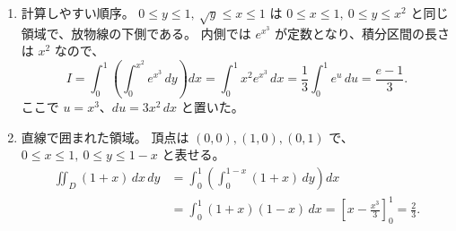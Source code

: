 \documentclass[a4paper,10pt,pdflatex,ja=standard,jafont=ipaex-type1,
  magstyle=real,scale=1]{bxjsarticle}
\newenvironment{problems}
  {\begin{enumerate}[leftmargin=2em,itemsep=3pt,topsep=3pt,parsep=0pt,
    font=\color{accent}]}
  {\end{enumerate}}
\newcommand{\examplelabel}[1]{{\sffamily\mdseries\color{ink}#1}}
\begin{document}
\begin{problems}
\item \examplelabel{計算しやすい順序。}
$0\le y\le1,\ \sqrt y\le x\le1$ は
$0\le x\le1,\ 0\le y\le x^2$ と同じ領域で、放物線の下側である。
内側では $e^{x^3}$ が定数となり、積分区間の長さは $x^2$ なので、
$$
 I=\int_0^1\left(\int_0^{x^2}e^{x^3}\,dy\right)dx
 =\int_0^1x^2e^{x^3}\,dx
 =\frac13\int_0^1e^u\,du=\frac{e-1}{3}.
$$
ここで $u=x^3$、$du=3x^2\,dx$ と置いた。

\item \examplelabel{直線で囲まれた領域。}
頂点は $(0,0),(1,0),(0,1)$ で、$0\le x\le1,\ 0\le y\le1-x$ と表せる。
$$
 \begin{aligned}
 \iint_D(1+x)\,dx\,dy
 &=\int_0^1\left(\int_0^{1-x}(1+x)\,dy\right)dx\\
 &=\int_0^1(1+x)(1-x)\,dx
 =\left[x-\frac{x^3}{3}\right]_0^1=\frac23.
 \end{aligned}
$$
\end{problems}
\end{document}
